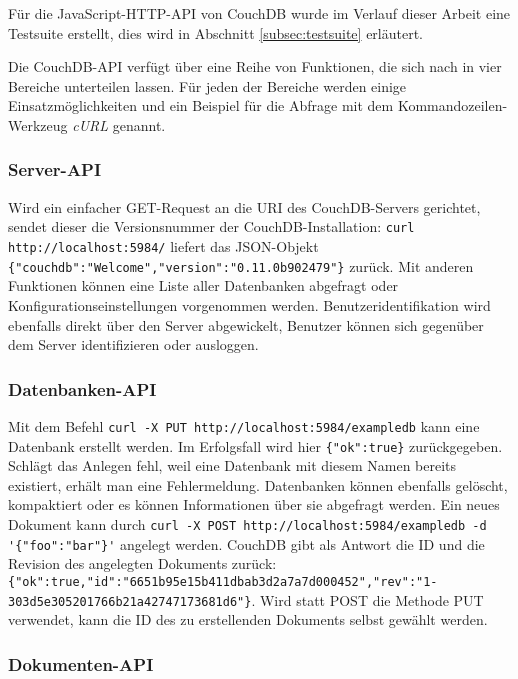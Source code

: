 Für die JavaScript-HTTP-API von CouchDB wurde im Verlauf dieser Arbeit eine Testsuite erstellt, dies wird in Abschnitt \ref{subsec:testsuite} erläutert. 

Die CouchDB-API verfügt über eine Reihe von Funktionen, die sich nach  in vier Bereiche unterteilen lassen. Für jeden der Bereiche werden einige Einsatzmöglichkeiten und ein Beispiel für die Abfrage mit dem Kommandozeilen-Werkzeug \textit{cURL} genannt.

\subsubsection{Server-API}

\lstset{language=bash}
Wird ein einfacher GET-Request an die URI des CouchDB-Servers gerichtet, sendet dieser die Versionsnummer der CouchDB-Installation: \lstinline!curl http://localhost:5984/! liefert das JSON-Objekt \lstinline!{"couchdb":"Welcome","version":"0.11.0b902479"}! zurück. Mit anderen Funktionen können eine Liste aller Datenbanken abgefragt oder Konfigurationseinstellungen vorgenommen werden. Benutzeridentifikation wird ebenfalls direkt über den Server abgewickelt, Benutzer können sich gegenüber dem Server identifizieren oder ausloggen. 

\subsubsection{Datenbanken-API}

Mit dem Befehl \lstinline!curl -X PUT http://localhost:5984/exampledb! kann eine Datenbank erstellt werden. Im Erfolgsfall wird hier \lstinline!{"ok":true}! zurückgegeben. Schlägt das Anlegen fehl, weil eine Datenbank mit diesem Namen bereits existiert, erhält man eine Fehlermeldung. Datenbanken können ebenfalls gelöscht, kompaktiert oder es können Informationen über sie abgefragt werden. Ein neues Dokument kann durch \lstinline!curl -X POST http://localhost:5984/exampledb -d '{"foo":"bar"}'! angelegt werden. CouchDB gibt als Antwort die ID und die Revision des angelegten Dokuments zurück: \lstinline!{"ok":true,"id":"6651b95e15b411dbab3d2a7a7d000452","rev":"1-303d5e305201766b21a42747173681d6"}!. Wird statt POST die Methode PUT verwendet, kann die ID des zu erstellenden Dokuments selbst gewählt werden. 

\subsubsection{Dokumenten-API}

